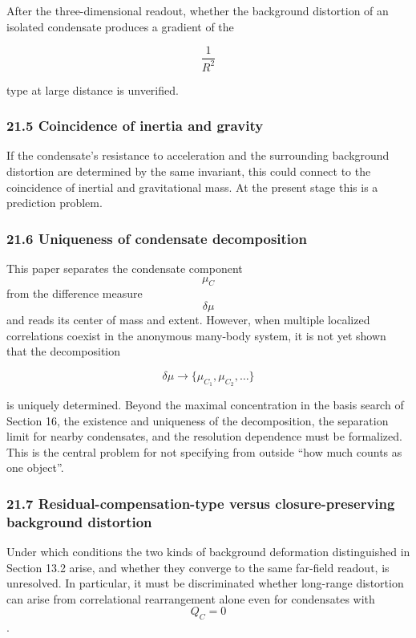 \documentclass[
  a4paper,
]{article}
\begin{document}
After the three-dimensional readout, whether the background distortion
of an isolated condensate produces a gradient of the

\[
\frac{1}{R^2}
\]

type at large distance is unverified.

\subsubsection{21.5 Coincidence of inertia and
gravity}\label{coincidence-of-inertia-and-gravity}

If the condensate's resistance to acceleration and the surrounding
background distortion are determined by the same invariant, this could
connect to the coincidence of inertial and gravitational mass. At the
present stage this is a prediction problem.

\subsubsection{21.6 Uniqueness of condensate
decomposition}\label{uniqueness-of-condensate-decomposition}

This paper separates the condensate component \[\mu_C\] from the
difference measure \[\delta\mu\] and reads its center of mass and
extent. However, when multiple localized correlations coexist in the
anonymous many-body system, it is not yet shown that the decomposition

\[
\delta\mu
\longrightarrow
\{\mu_{C_1},\mu_{C_2},\ldots\}
\]

is uniquely determined. Beyond the maximal concentration in the basis
search of Section 16, the existence and uniqueness of the decomposition,
the separation limit for nearby condensates, and the resolution
dependence must be formalized. This is the central problem for not
specifying from outside ``how much counts as one object''.

\subsubsection{21.7 Residual-compensation-type versus closure-preserving
background
distortion}\label{residual-compensation-type-versus-closure-preserving-background-distortion}

Under which conditions the two kinds of background deformation
distinguished in Section 13.2 arise, and whether they converge to the
same far-field readout, is unresolved. In particular, it must be
discriminated whether long-range distortion can arise from correlational
rearrangement alone even for condensates with \[Q_C=0\].
\end{document}
